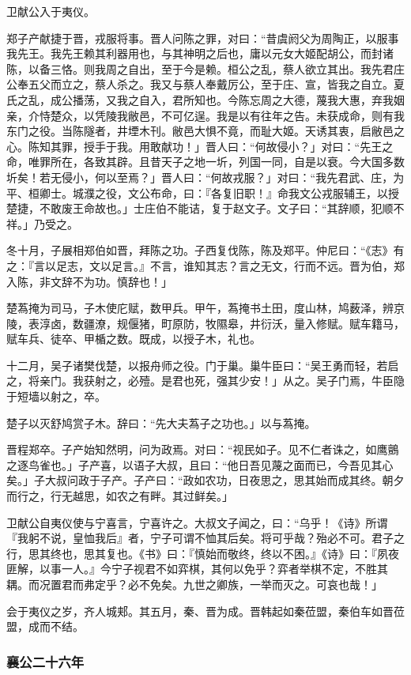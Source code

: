 \documentclass[]{article}
\begin{document}
卫献公入于夷仪。

郑子产献捷于晋，戎服将事。晋人问陈之罪，对曰：``昔虞阏父为周陶正，以服事我先王。我先王赖其利器用也，与其神明之后也，庸以元女大姬配胡公，而封诸陈，以备三恪。则我周之自出，至于今是赖。桓公之乱，蔡人欲立其出。我先君庄公奉五父而立之，蔡人杀之。我又与蔡人奉戴厉公，至于庄、宣，皆我之自立。夏氏之乱，成公播荡，又我之自入，君所知也。今陈忘周之大德，蔑我大惠，弃我姻亲，介恃楚众，以凭陵我敝邑，不可亿逞。我是以有往年之告。未获成命，则有我东门之役。当陈隧者，井堙木刊。敝邑大惧不竟，而耻大姬。天诱其衷，启敝邑之心。陈知其罪，授手于我。用敢献功！」晋人曰：``何故侵小？」对曰：``先王之命，唯罪所在，各致其辟。且昔天子之地一圻，列国一同，自是以衰。今大国多数圻矣！若无侵小，何以至焉？」晋人曰：``何故戎服？」对曰：``我先君武、庄，为平、桓卿士。城濮之役，文公布命，曰：『各复旧职！』命我文公戎服辅王，以授楚捷，不敢废王命故也。」士庄伯不能诘，复于赵文子。文子曰：``其辞顺，犯顺不祥。」乃受之。

冬十月，子展相郑伯如晋，拜陈之功。子西复伐陈，陈及郑平。仲尼曰：``《志》有之：『言以足志，文以足言。』不言，谁知其志？言之无文，行而不远。晋为伯，郑入陈，非文辞不为功。慎辞也！」

楚蒍掩为司马，子木使庀赋，数甲兵。甲午，蒍掩书土田，度山林，鸠薮泽，辨京陵，表淳卤，数疆潦，规偃猪，町原防，牧隰皋，井衍沃，量入修赋。赋车籍马，赋车兵、徒卒、甲楯之数。既成，以授子木，礼也。

十二月，吴子诸樊伐楚，以报舟师之役。门于巢。巢牛臣曰：``吴王勇而轻，若启之，将亲门。我获射之，必殪。是君也死，强其少安！」从之。吴子门焉，牛臣隐于短墙以射之，卒。

楚子以灭舒鸠赏子木。辞曰：``先大夫蒍子之功也。」以与蒍掩。

晋程郑卒。子产始知然明，问为政焉。对曰：``视民如子。见不仁者诛之，如鹰鸇之逐鸟雀也。」子产喜，以语子大叔，且曰：``他日吾见蔑之面而已，今吾见其心矣。」子大叔问政于子产。子产曰：``政如农功，日夜思之，思其始而成其终。朝夕而行之，行无越思，如农之有畔。其过鲜矣。」

卫献公自夷仪使与宁喜言，宁喜许之。大叔文子闻之，曰：``乌乎！《诗》所谓『我躬不说，皇恤我后』者，宁子可谓不恤其后矣。将可乎哉？殆必不可。君子之行，思其终也，思其复也。《书》曰：『慎始而敬终，终以不困。』《诗》曰：『夙夜匪解，以事一人。』今宁子视君不如弈棋，其何以免乎？弈者举棋不定，不胜其耦。而况置君而弗定乎？必不免矣。九世之卿族，一举而灭之。可哀也哉！」

会于夷仪之岁，齐人城郏。其五月，秦、晋为成。晋韩起如秦莅盟，秦伯车如晋莅盟，成而不结。

\hypertarget{header-n2204}{%
\subsubsection{襄公二十六年}\label{header-n2204}}
\end{document}
